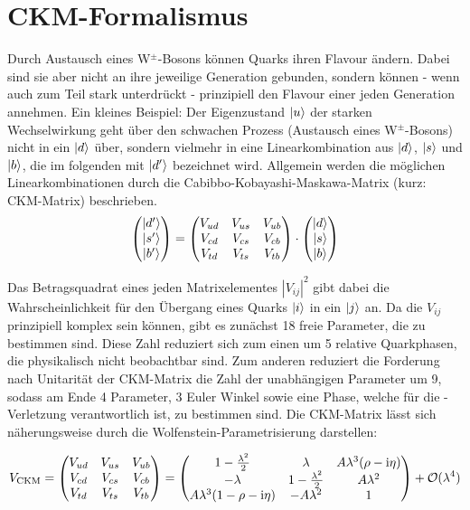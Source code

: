 \section{CKM-Formalismus}
Durch Austausch eines W$^{\pm}$-Bosons können Quarks ihren Flavour ändern. Dabei sind sie aber nicht an ihre jeweilige Generation gebunden, sondern können - wenn auch zum Teil stark unterdrückt - prinzipiell den Flavour einer jeden Generation annehmen. Ein kleines Beispiel: Der Eigenzustand $\Ket{u}$ der starken Wechselwirkung geht über den schwachen Prozess (Austausch eines W$^{\pm}$-Bosons) nicht in ein $\Ket{d}$ über, sondern vielmehr in eine Linearkombination aus $\Ket{d}$, $\Ket{s}$ und $\Ket{b}$, die im folgenden mit $\Ket{d'}$ bezeichnet wird. Allgemein werden die möglichen Linearkombinationen durch die Cabibbo-Kobayashi-Maskawa-Matrix (kurz: CKM-Matrix) beschrieben.
\begin{align}
\begin{pmatrix}
\Ket{d'} \\ \Ket{s'} \\ \Ket{b'}
\end{pmatrix}
=
\begin{pmatrix}
V_{ud} & V_{us} & V_{ub} \\
V_{cd} & V_{cs} & V_{cb} \\
V_{td} & V_{ts} & V_{tb} \\
\end{pmatrix}
\cdot
\begin{pmatrix}
\Ket{d} \\ \Ket{s} \\ \Ket{b}
\end{pmatrix}
\end{align}

Das Betragsquadrat eines jeden Matrixelementes $|V_{ij}|^2$ gibt dabei die Wahrscheinlichkeit für den Übergang eines Quarks $\Ket{i}$ in ein $\Ket{j}$ an. Da die $V_{ij}$ prinzipiell komplex sein können, gibt es zunächst 18 freie Parameter, die zu bestimmen sind. Diese Zahl reduziert sich zum einen um 5 relative Quarkphasen, die physikalisch nicht beobachtbar sind. Zum anderen reduziert die Forderung nach Unitarität der CKM-Matrix die Zahl der unabhängigen Parameter um 9, sodass am Ende 4 Parameter, 3 Euler Winkel sowie eine Phase, welche für die \CP-Verletzung verantwortlich ist, zu bestimmen sind. Die CKM-Matrix lässt sich näherungsweise durch die Wolfenstein-Parametrisierung darstellen:

\begin{align}
V_{\text{CKM}}=
\begin{pmatrix}
V_{ud} & V_{us} & V_{ub} \\
V_{cd} & V_{cs} & V_{cb} \\
V_{td} & V_{ts} & V_{tb} \\
\end{pmatrix}
=
\begin{pmatrix}
1-\frac{\lambda^2}{2} & \lambda & A\lambda^3(\rho-\mathrm{i}\eta) \\
-\lambda & 1-\frac{\lambda^2}{2} & A\lambda^2 \\
A\lambda^3(1-\rho-\mathrm{i}\eta) & -A\lambda^2 & 1
\end{pmatrix}
+ \mathcal{O}(\lambda^4)
\end{align}

